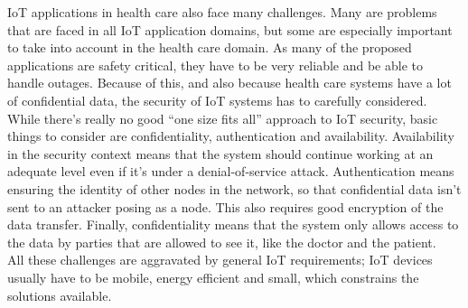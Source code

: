 IoT applications in health care also face many challenges. Many are problems
that are faced in all IoT application domains, but some are especially
important to take into account in the health care domain. As many of the
proposed applications are safety critical, they have to be very reliable and be
able to handle outages. Because of this, and also because health care systems
have a lot of confidential data, the security of IoT systems has to carefully
considered. While there's really no good ``one size fits all'' approach to IoT
security, basic things to consider are confidentiality, authentication and
availability. Availability in the security context means that the system should
continue working at an adequate level even if it's under a denial-of-service
attack. Authentication means ensuring the identity of other nodes in the
network, so that confidential data isn't sent to an attacker posing as a node.
This also requires good encryption of the data transfer. Finally,
confidentiality means that the system only allows access to the data by parties that
are allowed to see it, like the doctor and the patient.~\cite{Islam2015} All
these challenges are aggravated by general IoT requirements; IoT devices
usually have to be mobile, energy efficient and small, which constrains the
solutions available.






















